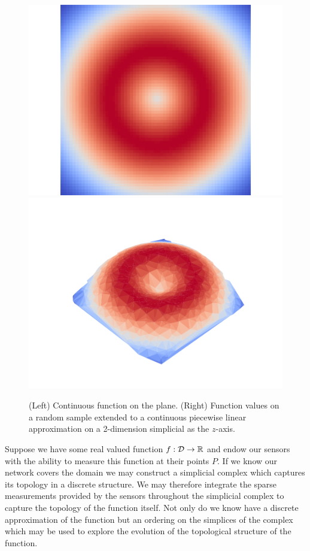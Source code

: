 \begin{figure}[htbp]
\centering
    \includegraphics[scale=0.45]{figures/fgrid.pdf}
    \includegraphics[scale=0.55]{figures/fcomplex.pdf}
    \caption{(Left) Continuous function on the plane.
            (Right) Function values on a random sample extended to a continuous piecewise linear approximation on a 2-dimension simplicial as the $z$-axis.}
    \label{fig:function}
\end{figure}

Suppose we have some real valued function $f:{\mathcal{D}}\to\mathbb{R}$ and endow our sensors with the ability to measure this function at their points $P$.
If we know our network covers the domain we may construct a simplicial complex which captures its topology in a discrete structure.
We may therefore integrate the sparse measurements provided by the sensors throughout the simplicial complex to capture the topology of the function itself.
Not only do we know have a discrete approximation of the function but an ordering on the simplices of the complex which may be used to explore the evolution of the topological structure of the function.

